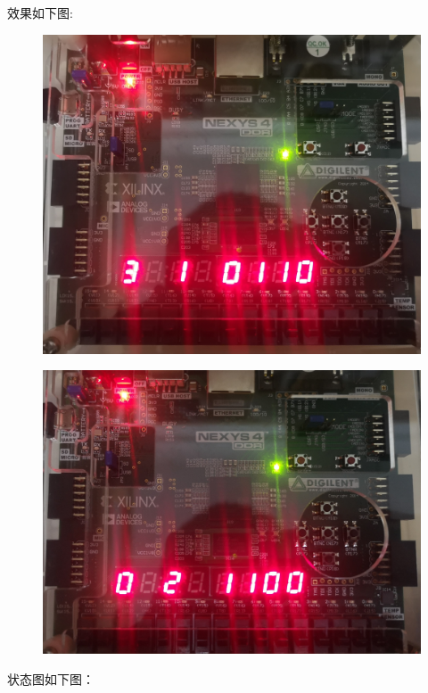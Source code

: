 \documentclass[UTF8]{article}
\begin{document}
	效果如下图:\par
	\begin{figure}[H]
		\begin{minipage}[H]{0.48\linewidth}
			\centering
			\includegraphics[scale=0.08]{e4_1.jpg}
			\label{e4_1}
		\end{minipage}
		\qquad
		\begin{minipage}[H]{0.48\linewidth}
			\centering
			\includegraphics[scale=0.08]{e4_2.jpg}
			\label{e4_2}
		\end{minipage}
	\end{figure}
	状态图如下图：\par
\end{document}
